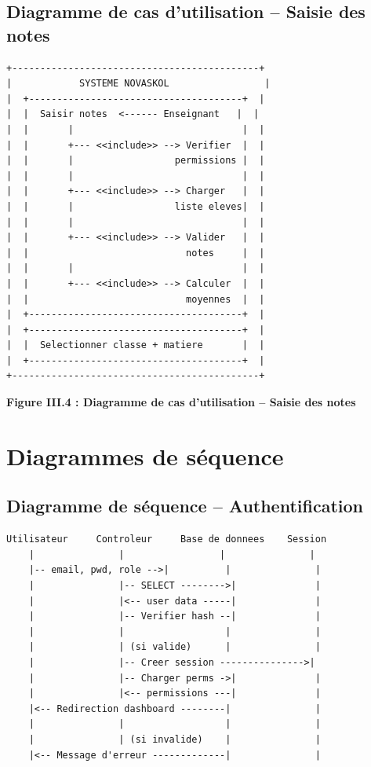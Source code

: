 \documentclass[12pt,a4paper,twoside]{report}
\begin{document}
\subsection{Diagramme de cas d'utilisation -- Saisie des notes}

\begin{verbatim}
+--------------------------------------------+
|            SYSTEME NOVASKOL                 |
|  +--------------------------------------+  |
|  |  Saisir notes  <------ Enseignant   |  |
|  |       |                              |  |
|  |       +--- <<include>> --> Verifier  |  |
|  |       |                  permissions |  |
|  |       |                              |  |
|  |       +--- <<include>> --> Charger   |  |
|  |       |                  liste eleves|  |
|  |       |                              |  |
|  |       +--- <<include>> --> Valider   |  |
|  |                            notes     |  |
|  |       |                              |  |
|  |       +--- <<include>> --> Calculer  |  |
|  |                            moyennes  |  |
|  +--------------------------------------+  |
|  +--------------------------------------+  |
|  |  Selectionner classe + matiere       |  |
|  +--------------------------------------+  |
+--------------------------------------------+
\end{verbatim}

\begin{center}
\textbf{Figure III.4 : Diagramme de cas d'utilisation -- Saisie des notes}
\end{center}

\section{Diagrammes de séquence}

\subsection{Diagramme de séquence -- Authentification}

\begin{verbatim}
Utilisateur     Controleur     Base de donnees    Session
    |               |                 |               |
    |-- email, pwd, role -->|          |               |
    |               |-- SELECT -------->|              |
    |               |<-- user data -----|              |
    |               |-- Verifier hash --|              |
    |               |                  |               |
    |               | (si valide)      |               |
    |               |-- Creer session --------------->|
    |               |-- Charger perms ->|              |
    |               |<-- permissions ---|              |
    |<-- Redirection dashboard --------|               |
    |               |                  |               |
    |               | (si invalide)    |               |
    |<-- Message d'erreur -------------|               |
\end{verbatim}
\end{document}
